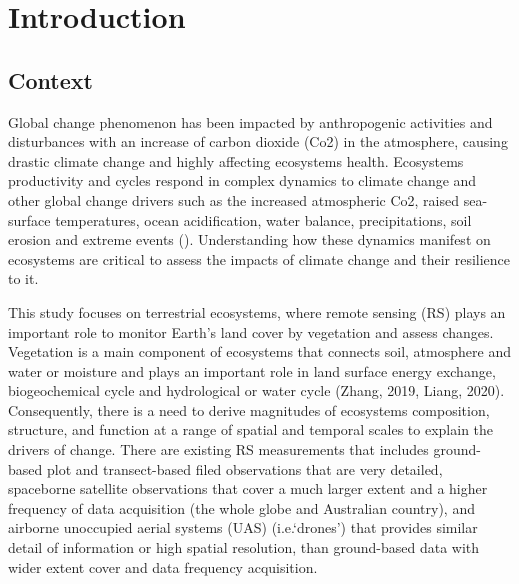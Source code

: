 \chapter{Introduction}\label{cha:introduction}

\section{Context}
Global change phenomenon has been impacted by anthropogenic activities and disturbances with an
increase of carbon dioxide (Co2) in the atmosphere, causing drastic climate change and highly
affecting ecosystems health. Ecosystems productivity and cycles respond in complex dynamics to
climate change and other global change drivers such as the increased atmospheric Co2, raised sea-
surface temperatures, ocean acidification, water balance, precipitations, soil erosion and extreme
events (\citealp{malhiClimateChangeEcosystems2020}). Understanding how these dynamics manifest
on ecosystems are critical to assess the impacts of climate change and their resilience to it.

This study focuses on terrestrial ecosystems, where remote sensing (RS) plays an important role to
monitor Earth’s land cover by vegetation and assess changes. Vegetation is a main component of
ecosystems that connects soil, atmosphere and water or moisture and plays an important role in land
surface energy exchange, biogeochemical cycle and hydrological or water cycle (Zhang, 2019, Liang, 2020).
Consequently, there is a need to derive magnitudes of ecosystems composition, structure, and function at
a range of spatial and temporal scales to explain the drivers of change. There are existing RS measurements
that includes ground-based plot and transect-based filed observations that are very detailed, spaceborne
satellite observations that cover a much larger extent and a higher frequency of data acquisition (the whole
globe and Australian country), and airborne unoccupied aerial systems (UAS) (i.e.‘drones’) that provides
similar detail of information or high spatial resolution, than ground-based data with wider extent cover
and data frequency acquisition.

